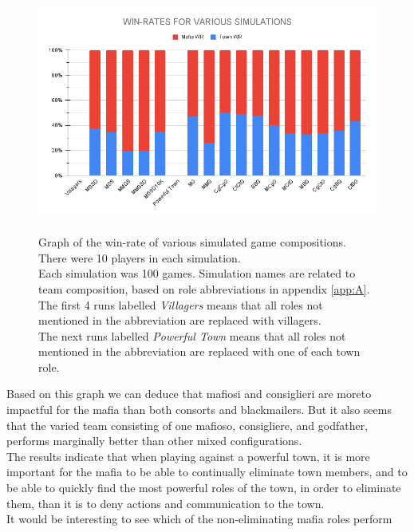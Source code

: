 \begin{figure}[H]
    \includegraphics[width=1\linewidth]{figures/Winrates}
    \caption{\\Graph of the win-rate of various simulated game compositions.\\
        There were 10 players in each simulation.\\
        Each simulation was 100 games.
        Simulation names are related to team composition, based on role
        abbreviations in appendix \ref{app:A}.\\
        The first 4 runs labelled \textit{Villagers} means that all roles not
        mentioned in the abbreviation are replaced with villagers.\\
        The next runs labelled \textit{Powerful Town} means that all roles not
        mentioned in the abbreviation are replaced with	one of each town role.}
    \label{fig:VariousSimulations}
\end{figure}
\vspace{-5px}Based on this graph we can deduce that mafiosi and
consiglieri are moreto
impactful for the mafia than both consorts and blackmailers. But it also seems
that the varied team consisting of one mafioso, consigliere, and godfather,
performs marginally better than other mixed configurations. \\
The results indicate  that when playing against a powerful town, it is more
important for the mafia to be able to continually eliminate town members, and to be
able to quickly find the most powerful roles of the town, in order to eliminate
them, than it is to deny actions and communication to the town. \\
It would be interesting to see which of the non-eliminating mafia roles perform
